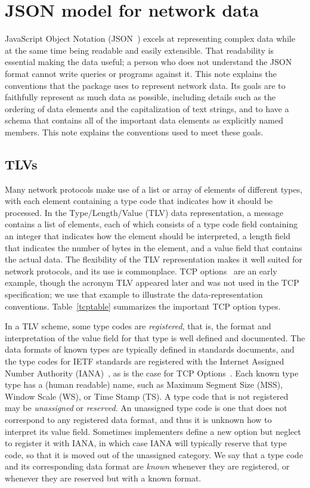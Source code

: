 \documentclass{book}
\begin{document}
\section{JSON model for network data} 
JavaScript Object Notation (JSON~\cite{rfc7159}) excels at
representing complex data while at the same time being readable and
easily extensible.  That readability is essential making the data
useful; a person who does not understand the JSON format cannot write
queries or programs against it.  This note explains the conventions
that the  package uses to represent network data.  Its
goals are to faithfully represent as much data as possible, including
details such as the ordering of data elements and the capitalization
of text strings, and to have a schema that contains all of the
important data elements as explicitly named members.  This note
explains the conventions used to meet these goals.

\subsection{TLVs}
Many network protocols make use of a list or array of elements of
different types, with each element containing a type code that
indicates how it should be processed.  In the Type/Length/Value (TLV)
data representation, a message contains a list of elements, each of
which consists of a type code field containing an integer that
indicates how the element should be interpreted, a length field that
indicates the number of bytes in the element, and a value field that
contains the actual data.  The flexibility of the TLV representation
makes it well suited for network protocols, and its use is commonplace.
TCP options~\cite{rfc793,ianatcp} are an early example, though the acronym TLV
appeared later and was not used in the TCP specification;
we use that example to illustrate the  data-representation conventions.
Table~\ref{tcptable} summarizes the important TCP option types.

In a TLV scheme, some type codes are \textit{registered}, that is, the
format and interpretation of the value field for that type is well
defined and documented.  The data formats of known types are typically
defined in standards documents, and the type codes for IETF standards
are registered with the Internet Assigned Number Authority
(IANA)~\cite{iana}, as is the case for TCP Options~\cite{ianatcp}. Each
known type type has a (human readable) name, such as Maximum Segment
Size (MSS), Window Scale (WS), or Time Stamp (TS).  A type code that
is not registered may be \textit{unassigned} or \textit{reserved}.  An
unassigned type code is one that does not correspond to any registered
data format, and thus it is unknown how to interpret its value field.
Sometimes implementers define a new option but neglect to register it
with IANA, in which case IANA will typically reserve that type code,
so that it is moved out of the unassigned category.
We say that a type code and its corresponding data format
are \textit{known} whenever they are registered, or whenever they are
reserved but with a known format.  
\end{document}
